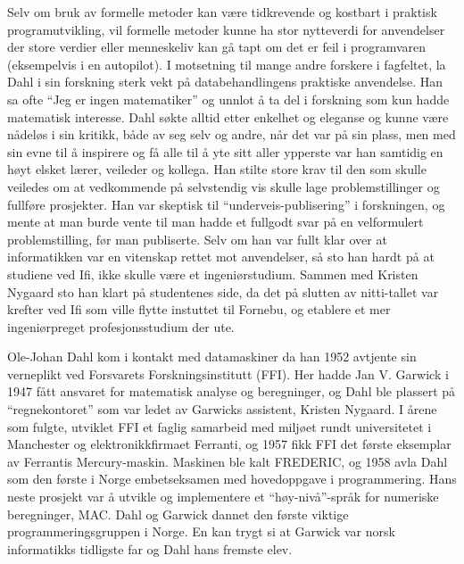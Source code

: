 \documentclass[../../main.tex]{subfiles}
\begin{document}
Selv om bruk av formelle metoder kan være tidkrevende og kostbart i praktisk programutvikling, vil formelle metoder kunne ha stor nytteverdi for anvendelser der store verdier eller menneskeliv kan gå tapt om det er feil i programvaren (eksempelvis i en autopilot). I motsetning til mange andre forskere i fagfeltet, la Dahl i sin forskning sterk vekt på databehandlingens praktiske anvendelse. Han sa ofte ``Jeg er ingen matematiker'' og unnlot å ta del i forskning som kun hadde matematisk interesse. Dahl søkte alltid etter enkelhet og eleganse og kunne være nådeløs i sin kritikk, både av seg selv og andre, når det var på sin plass, men med sin evne til å inspirere og få alle til å yte sitt aller ypperste var han samtidig en høyt elsket lærer, veileder og kollega. Han stilte store krav til den som skulle veiledes om at vedkommende på selvstendig vis skulle lage problemstillinger og fullføre prosjekter. Han var skeptisk til ``underveis-publisering'' i forskningen, og mente at man burde vente til man hadde et fullgodt svar på en velformulert problemstilling, før man publiserte. Selv om han var fullt klar over at informatikken var en vitenskap rettet mot anvendelser, så sto han hardt på at studiene ved Ifi, ikke skulle være et ingeniørstudium. Sammen med Kristen Nygaard sto han klart på studentenes side, da det på slutten av nitti-tallet var krefter ved Ifi som ville flytte instuttet til Fornebu, og etablere et mer ingeniørpreget profesjonsstudium der ute.

Ole-Johan Dahl kom i kontakt med datamaskiner da han 1952 avtjente sin verneplikt ved Forsvarets Forskningsinstitutt (FFI). Her hadde Jan V. Garwick i 1947 fått ansvaret for matematisk analyse og beregninger, og Dahl ble plassert på ``regnekontoret'' som var ledet av Garwicks assistent, Kristen Nygaard. I årene som fulgte, utviklet FFI et faglig samarbeid med miljøet rundt universitetet i Manchester og elektronikkfirmaet Ferranti, og 1957 fikk FFI det første eksemplar av Ferrantis Mercury-maskin. Maskinen ble kalt FREDERIC, og 1958 avla Dahl som den første i Norge embetseksamen med hovedoppgave i programmering. Hans neste prosjekt var å utvikle og implementere et ``høy-nivå''-språk for numeriske beregninger, MAC. Dahl og Garwick dannet den første viktige programmeringsgruppen i Norge. En kan trygt si at Garwick var norsk informatikks tidligste far og Dahl hans fremste elev.
\end{document}
